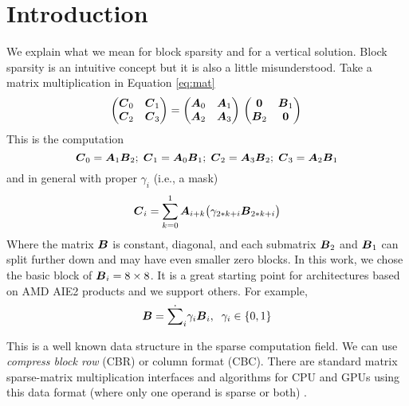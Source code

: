 \documentclass[sigconf]{acmart}
\begin{document}
\section{Introduction}
\label{sec:introduction}

We explain what we mean for block sparsity and for a vertical
solution. Block sparsity is an intuitive concept but it is also a
little misunderstood. Take a matrix multiplication in Equation
\ref{eq:mat}
\begin{equation}
  \label{eq:mat}
  \begin{pmatrix}
    {\boldsymbol C}_0 & {\boldsymbol C}_1 \\
    {\boldsymbol C}_2 & {\boldsymbol C}_3 \\ 
  \end{pmatrix} = 
  \begin{pmatrix}
    {\boldsymbol A}_0 & {\boldsymbol A}_1 \\
    {\boldsymbol A}_2 & {\boldsymbol A}_3 \\ 
  \end{pmatrix}\\  \begin{pmatrix}
    {\boldsymbol 0}   & {\boldsymbol B}_1 \\
    {\boldsymbol B}_2 & {\boldsymbol 0} \\ 
  \end{pmatrix}\\
\end{equation}
This is the computation {\small \begin{equation} {\boldsymbol C}_0 = {\boldsymbol A}_{1}
    {\boldsymbol B}_{2}; \; {\boldsymbol C}_1 = {\boldsymbol A}_{0} {\boldsymbol B}_{1}; \; {\boldsymbol C}_2 =
    {\boldsymbol A}_{3} {\boldsymbol B}_{2}; \; {\boldsymbol C}_3 = {\boldsymbol A}_{2} {\boldsymbol B}_{1}
\end{equation}}
and in general with proper $\gamma_i$ (i.e., a mask)
\begin{equation}
  {\boldsymbol C}_i = \sum_{k=0}^1 {\boldsymbol A}_{i+ k} \big(\gamma_{2*k+i} {\boldsymbol B}_{2*k+i}\big)
\end{equation}
Where the matrix ${\boldsymbol B}$ is constant, diagonal, and each submatrix
${\boldsymbol B_2}$ and ${\boldsymbol B}_1$ can split further down and may have even
smaller zero blocks. In this work, we chose the basic block of
${\boldsymbol B}_i = 8\times 8$. It is a great starting point for architectures
based on AMD AIE2 products and we support others.  For example,
\begin{equation}
  {\boldsymbol B} = \dot{\sum}_i \gamma_i {\boldsymbol B}_i, \;\; \gamma_i \in \{0,1\} 
\end{equation}

This is a well known data structure in the sparse computation field.
We can use {\em compress block row} (CBR) or {\em }column format
(CBC). There are standard matrix sparse-matrix multiplication
interfaces and algorithms for CPU and GPUs using this data format
(where only one operand is sparse or both) \cite{rocSPARSE,cuSPARSE}.
\end{document}
